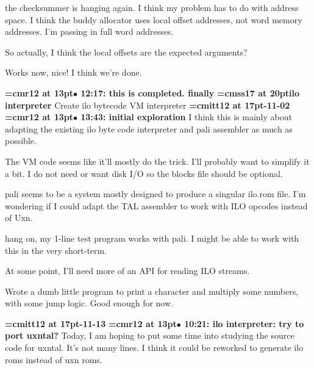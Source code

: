 the checksummer is hanging again. I think my problem has to do with address space. I think the buddy allocator uses local offset addresses, not word memory addresses. I'm passing in full word addresses.
\par

So actually, I think the local offsets are the expected arguments?
\par

Works now, nice! I think we're done.
\par

{\smallskip\noindent\bf\font\titlefont=cmr12 at 13pt\titlefont $\bullet$ 12:17: this is completed. finally}\smallskip
{}
{\medskip\noindent\bf\font\titlefont=cmss17 at 20pt\titlefont ilo interpreter}\medskip
Create ilo bytecode VM interpreter
{\medskip\noindent\bf\font\titlefont=cmitt12 at 17pt-11-02}\medskip
{\smallskip\noindent\bf\font\titlefont=cmr12 at 13pt\titlefont $\bullet$ 13:43: initial exploration}\smallskip
I think this is mainly about adapting the existing ilo byte code interpreter and pali assembler as much as possible.
\par

The VM code seems like it'll mostly do the trick. I'll probably want to simplify it a bit. I do not need or want disk I/O so the blocks file should be optional.
\par

pali seems to be a system mostly designed to produce a singular ilo.rom file. I'm wondering if I could adapt the TAL assembler to work with ILO opcodes instead of Uxn.
\par

hang on, my 1-line test program works with pali. I might be able to work with this in the very short-term.
\par

At some point, I'll need more of an API for reading ILO streams.
\par

Wrote a dumb little program to print a character and multiply some numbers, with some jump logic. Good enough for now.
\par

{\medskip\noindent\bf\font\titlefont=cmitt12 at 17pt-11-13}\medskip
{\smallskip\noindent\bf\font\titlefont=cmr12 at 13pt\titlefont $\bullet$ 10:21: ilo interpreter: try to port uxntal?}\smallskip
Today, I am hoping to put some time into studying the source code for uxntal. It's not many lines. I think it could be reworked to generate ilo roms instead of uxn roms.
\par

